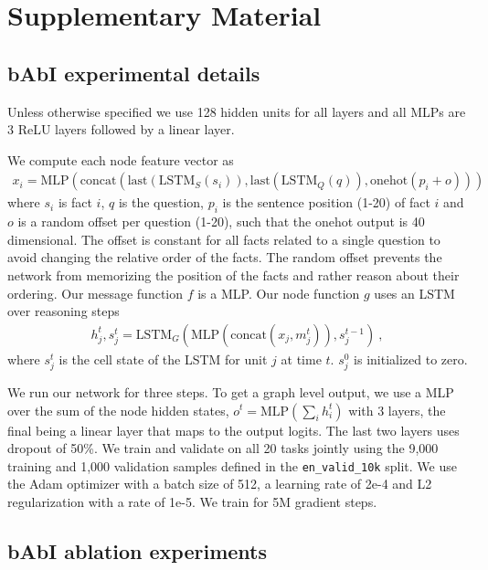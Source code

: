 \section{Supplementary Material}

\subsection{bAbI experimental details}
Unless otherwise specified we use 128 hidden units for all layers and all MLPs are 3 ReLU layers followed by a linear layer.

We compute each node feature vector as 
\begin{align*}
x_i = \text{MLP}(\text{concat}(\text{last}(\text{LSTM}_S(s_i)), \text{last}(\text{LSTM}_Q(q)), \text{onehot}(p_i + o)))
\end{align*}
where $s_i$ is fact $i$, $q$ is the question, $p_i$ is the sentence position (1-20) of fact $i$ and $o$ is a random offset per question (1-20), such that the onehot output is 40 dimensional. The offset is constant for all facts related to a single question to avoid changing the relative order of the facts. The random offset prevents the network from memorizing the position of the facts and rather reason about their ordering.
Our message function $f$ is a MLP. Our node function $g$ uses an LSTM over reasoning steps
%
\begin{align*}
	h_j^t, s_j^t = \text{LSTM}_G(\text{MLP}(\text{concat}(x_j, m_{j}^t)), s_j^{t-1}) \ ,
\end{align*}
where $s_j^t$ is the cell state of the LSTM for unit $j$ at time $t$. $s_j^0$ is initialized to zero.

We run our network for three steps. To get a graph level output, we use a MLP over the sum of the node hidden states, $o^t = \text{MLP}\left(\sum_i h_i^t\right)$ with 3 layers, the final being a linear layer that maps to the output logits. The last two layers uses dropout of 50\%. We train and validate on all 20 tasks jointly using the 9,000 training and 1,000 validation samples defined in the \texttt{en\_valid\_10k} split. We use the Adam optimizer with a batch size of 512, a learning rate of 2e-4 and L2 regularization with a rate of 1e-5. We train for 5M gradient steps.

\subsection{bAbI ablation experiments}

